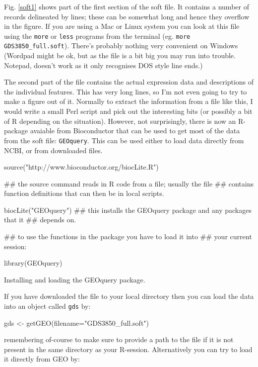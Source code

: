 \documentclass[11pt]{article}
\begin{document}
Fig. \ref{soft1} shows part of the first section of the soft file. It contains a number of records
delineated by lines; these can be somewhat long and hence they overflow in the figure. If you
are using a Mac or Linux system you can look at this file using the \texttt{more} or \texttt{less}
programs from the terminal (eg. \texttt{more GDS3850\_full.soft}). There's probably
nothing very convenient on Windows (Wordpad might be ok, but as the file is a bit big you
may run into trouble. Notepad, doesn't work as it only recognises DOS style line ends.) 

The second part of the file contains the actual expression data and descriptions of the individual
features. This has very long lines, so I'm not even going to try to make a figure
out of it. Normally to extract the information from a file like this, I would write
a small Perl script and pick out the interesting bits (or possibly a bit of R depending
on the situation). However, not surprisingly, there is now an R-package avaiable from
Bioconductor that can be used to get most of the data from the soft file: \texttt{GEOquery}.
This can be used either to load data directly from NCBI, or from downloaded files.

\begin{listing}
\begin{rcode}
source("http://www.bioconductor.org/biocLite.R")

## the source command reads in R code from a file; usually the file
## contains function definitions that can then be in local scripts.

biocLite("GEOquery")
## this installs the GEOquery package and any packages that it
## depends on.

## to use the functions in the package you have to load it into
## your current session:

library(GEOquery)
\end{rcode}
\caption{Installing and loading the GEOquery package.}
\label{lis1}
\end{listing}

If you have downloaded the file to your local directory then you can
load the data into an object called \texttt{gds} by:

\begin{rcode}
  gds <- getGEO(filename="GDS3850_full.soft")
\end{rcode}

remembering of-course to make sure to provide a path to the file if
it is not present in the same directory as your R-session.
Alternatively you can try to load it directly from GEO by:
\end{document}

